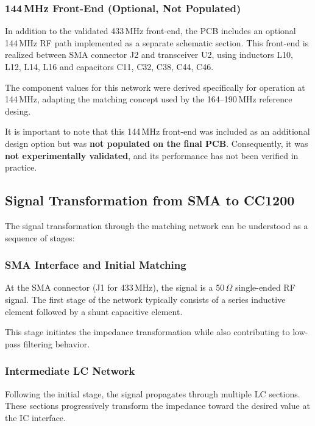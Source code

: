 \subsubsection{144\,MHz Front-End (Optional, Not Populated)}

In addition to the validated 433\,MHz front-end, the PCB includes an optional 144\,MHz RF path implemented as a separate schematic section. This front-end is realized between SMA connector J2 and transceiver U2, using inductors L10, L12, L14, L16 and capacitors C11, C32, C38, C44, C46.

The component values for this network were derived specifically for operation at 144\,MHz, adapting the matching concept used by the 164--190\,MHz reference desing.

It is important to note that this 144\,MHz front-end was included as an additional design option but was \textbf{not populated on the final PCB}. Consequently, it was \textbf{not experimentally validated}, and its performance has not been verified in practice.

\subsection{Signal Transformation from SMA to CC1200}

The signal transformation through the matching network can be understood as a sequence of stages:

\subsubsection{SMA Interface and Initial Matching}

At the SMA connector (J1 for 433\,MHz), the signal is a 50\,$\Omega$ single-ended RF signal. The first stage of the network typically consists of a series inductive element followed by a shunt capacitive element.

This stage initiates the impedance transformation while also contributing to low-pass filtering behavior.

\subsubsection{Intermediate LC Network}

Following the initial stage, the signal propagates through multiple LC sections. These sections progressively transform the impedance toward the desired value at the IC interface.

